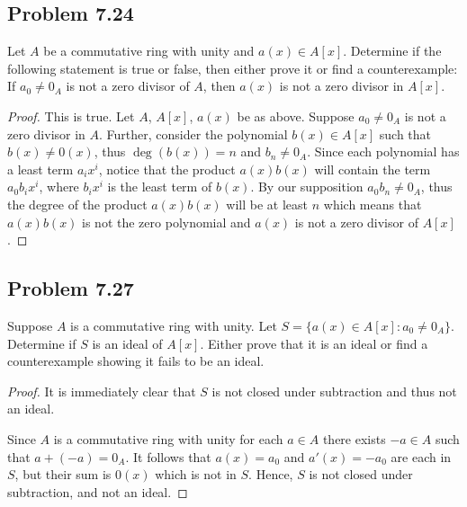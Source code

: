 \documentclass[letterpaper, 12pt]{amsart}
\begin{document}
		\subsection*{Problem 7.24}
		\label{sub:problem_7_24}
		Let $A$ be a commutative ring with unity and $a(x) \in A[x]$. 
		Determine if the following statement is true or false, then either prove it or find a counterexample: 
		If $a_{0} \neq 0_{A}$ is not a zero divisor of $A$, then $a(x)$ is not a zero divisor in $A[x]$.
			\begin{proof}
			This is true.
			Let $A$, $A[x]$, $a(x)$ be as above.
			Suppose $a_{0} \neq 0_{A}$ is not a zero divisor in $A$.
			Further, consider the polynomial $b(x) \in A[x]$ such that $b(x) \neq 0(x)$, thus $\deg(b(x)) = n$ and $b_{n} \neq 0_{A}$.
			Since each polynomial has a least term $a_{i}x^{i}$, notice that the product $a(x)b(x)$ will contain the term $a_{0}b_{i}x^{i}$, where $b_{i}x^{i}$ is the least term of $b(x)$. 
			By our supposition $a_{0}b_{n} \neq 0_{A}$, thus the degree of the product $a(x)b(x)$ will be at least $n$ which means that $a(x)b(x)$ is not the zero polynomial and $a(x)$ is not a zero divisor of $A[x]$.
			\end{proof}

		\subsection*{Problem 7.27}
		\label{sub:problem_7_27}
		Suppose $A$ is a commutative ring with unity. 
		Let $S = \{ a(x) \in A[x] : a_{0} \neq 0_{A} \}$. 
		Determine if $S$ is an ideal of $A[x]$. 
		Either prove that it is an ideal or find a counterexample showing it fails to be an ideal.
			\begin{proof}
			It is immediately clear that $S$ is not closed under subtraction and thus not an ideal.

			Since $A$ is a commutative ring with unity for each $a \in A$ there exists $-a \in A$ such that $a + (-a) = 0_{A}$.
			It follows that $a(x) = a_{0}$ and $a'(x) = -a_{0}$ are each in $S$, but their sum is $0(x)$ which is not in $S$.
			Hence, $S$ is not closed under subtraction, and not an ideal.
			\end{proof}
\end{document}
